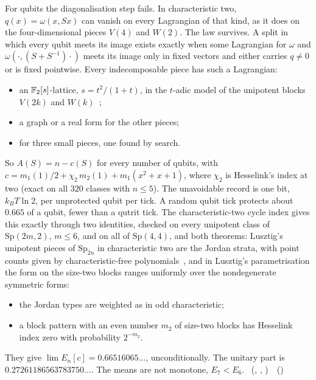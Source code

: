 For qubits the diagonalisation step fails. In characteristic two, $q(x)=\omega(x,Sx)$ can vanish on every Lagrangian
of that kind, as it does on the four-dimensional pieces $V(4)$ and $W(2)$. The law survives. A split in which every
qubit meets its image exists exactly when some Lagrangian for $\omega$ and $\omega(\cdot,(S+S^{-1})\cdot)$ meets its
image only in fixed vectors and either carries $q\ne0$ or is fixed pointwise. Every indecomposable piece has such a
Lagrangian:
\begin{itemize}
\item an $\mathbb{F}_2[s]$-lattice, $s=t^2/(1+t)$, in the $t$-adic model of the unipotent blocks $V(2k)$ and
  $W(k)$~\cite{Hesselink1980};
\item a graph or a real form for the other pieces;
\item for three small pieces, one found by search.
\end{itemize}
So $A(S)=n-c(S)$ for every number of qubits, with $c=m_1(1)/2+\chi_2\,m_2(1)+m_1(x^2+x+1)$, where $\chi_2$ is
Hesselink's index at two (exact on all $320$ classes with $n\le5$). The unavoidable record is one bit, $k_BT\ln2$, per
unprotected qubit per tick. A random qubit tick protects about $0.665$ of a qubit, fewer than a qutrit tick. The
characteristic-two cycle index gives this exactly through two identities, checked on every unipotent class of
$\mathrm{Sp}(2m,2)$, $m\le6$, and on all of $\mathrm{Sp}(4,4)$, and both theorems: Lusztig's unipotent pieces of
$\mathrm{Sp}_{2n}$ in characteristic two are the Jordan strata, with point counts given by characteristic-free
polynomials~\cite{Lusztig2005,Xue2012}, and in Lusztig's parametrisation the form on the size-two blocks ranges
uniformly over the nondegenerate symmetric forms:
\begin{itemize}
\item the Jordan types are weighted as in odd characteristic;
\item a block pattern with an even number $m_2$ of size-two blocks has Hesselink index zero with probability $2^{-m_2}$.
\end{itemize}
They give $\lim E_n[c]=0.66516065\ldots$, unconditionally. The unitary part is $0.27261186563783750\ldots$. The means are not monotone,
$E_7<E_6$. \tierC\ (, ,
)
\tierT\,\tierC\ ()

